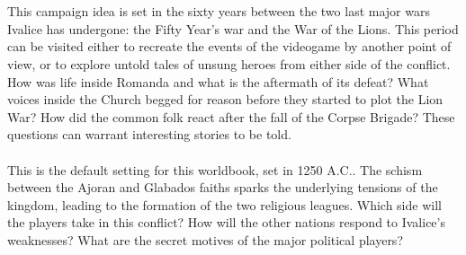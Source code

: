 \begin{multicols}{2}
%
\\\\
%
This campaign idea is set in the sixty years between the two last major wars Ivalice has undergone: the Fifty Year’s war and the War of the Lions.
This period can be visited either to recreate the events of the videogame by another point of view, or to explore untold tales of unsung heroes from either side of the conflict.
How was life inside Romanda and what is the aftermath of its defeat? 
What voices inside the Church begged for reason before they started to plot the Lion War?
How did the common folk react after the fall of the Corpse Brigade? 
These questions can warrant interesting stories to be told.
%
\\\\
%
This is the default setting for this worldbook, set in 1250 A.C..
The schism between the Ajoran and Glabados faiths sparks the underlying tensions of the kingdom, leading to the formation of the two religious leagues. 
Which side will the players take in this conflict? 
How will the other nations respond to Ivalice’s weaknesses? 
What are the secret motives of the major political players?
%
\end{multicols}
%
%
\twocolumn
\clearpage